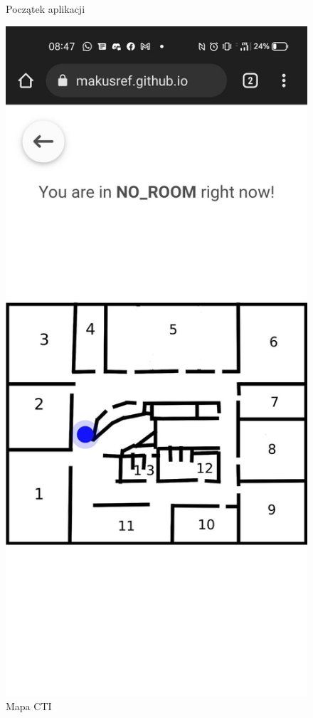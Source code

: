 \documentclass{classrep}
\begin{document}
{\begin{figure}[ht]
    \caption{Początek aplikacji}

    \label{fig}

\end{figure}
\begin{figure}[ht]

    \centering

  \includegraphics[scale=0.2]{photo2.png}

    \caption{Mapa CTI}

    \label{fig}

\end{figure}
}
\end{document}
